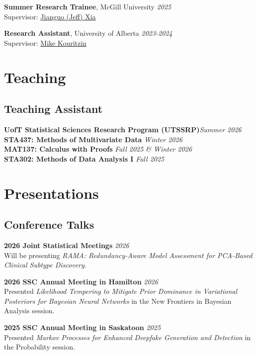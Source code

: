 \documentclass[11pt]{article}
\theoremstyle{definition}
\newcommand{\1}{\mathds 1}
\begin{document}
\textbf{Summer Research Trainee}, McGill University \hfill \textit{2025}\\
\indent\hspace{0.2cm} Supervisor: \href{https://www.xialab.ca/}{Jianguo (Jeff) Xia}
\vspace{0.5em}

\textbf{Research Assistant}, University of Alberta \hfill \textit{2023-2024}\\
\indent\hspace{0.2cm} Supervisor: \href{https://www.math.ualberta.ca/~mkouritz/Kouritzin_M.html}{Mike Kouritzin}

\section*{Teaching}
\subsection*{Teaching Assistant}
\textbf{UofT Statistical Sciences Research Program (UTSSRP)}\hfill \textit{Summer 2026}\\
\textbf{STA437: Methods of Multivariate Data} \hfill \textit{Winter 2026}\\
\textbf{MAT137: Calculus with Proofs} \hfill \textit{Fall 2025 \& Winter 2026}\\
\textbf{STA302: Methods of Data Analysis I} \hfill \textit{Fall 2025}


\section*{Presentations}
\subsection*{Conference Talks}
\textbf{2026 Joint Statistical Meetings} \hfill \textit{2026}\\
Will be presenting \textit{RAMA: Redundancy-Aware Model Assessment for PCA-Based Clinical Subtype Discovery}. 
\vspace{0.5em}

\textbf{2026 SSC Annual Meeting in Hamilton} \hfill \textit{2026}\\
Presented \textit{Likelihood Tempering to Mitigate Prior Dominance in Variational Posteriors for Bayesian Neural Networks } in the New Frontiers in Bayesian Analysis session.
\vspace{0.5em}

\textbf{2025 SSC Annual Meeting in Saskatoon} \hfill \textit{2025}\\
Presented \textit{Markov Processes for Enhanced Deepfake Generation and Detection} in the Probability session. 
\vspace{0.5em}
\end{document}
